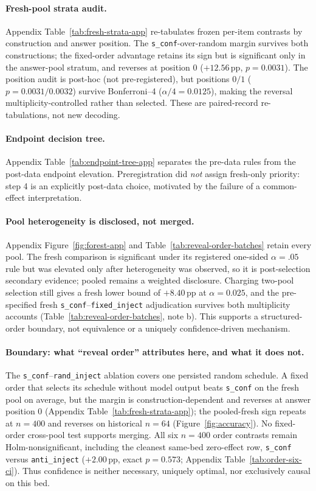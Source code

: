 \documentclass{article}
\newcommand{\sconf}{\texttt{s\_conf}}
\newcommand{\rinj}{\texttt{rand\_inject}}
\newcommand{\ainj}{\texttt{anti\_inject}}
\newcommand{\finj}{\texttt{fixed\_inject}}
\newcommand{\pp}{\,\mathrm{pp}}
\begin{document}
\paragraph{Fresh-pool strata audit.}
Appendix Table~\ref{tab:fresh-strata-app} re-tabulates frozen per-item contrasts by
construction and answer position.  The \sconf{}-over-random margin survives
both constructions; the fixed-order advantage retains its sign but is
significant only in the answer-pool stratum, and reverses at position $0$
($+12.56\pp$, $p{=}0.0031$).  The position audit is post-hoc (not
pre-registered), but positions $0/1$ ($p{=}0.0031/0.0032$) survive
Bonferroni--4 ($\alpha/4{=}0.0125$), making the reversal
multiplicity-controlled rather than selected.  These are paired-record
re-tabulations, not new decoding.

\paragraph{Endpoint decision tree.}
Appendix Table~\ref{tab:endpoint-tree-app} separates the pre-data rules from the post-data
endpoint elevation.  Preregistration did \emph{not} assign fresh-only priority:
step 4 is an explicitly post-data choice, motivated by the failure of a
common-effect interpretation.

\paragraph{Pool heterogeneity is disclosed, not merged.}
Appendix Figure~\ref{fig:forest-app} and Table~\ref{tab:reveal-order-batches} retain every
pool.  The fresh comparison is significant under its registered one-sided
$\alpha=.05$ rule but was elevated only after heterogeneity was observed, so it
is post-selection secondary evidence; pooled remains a weighted disclosure.
Charging two-pool selection still gives a fresh lower bound of $+8.40\pp$ at
$\alpha=0.025$, and the pre-specified fresh \sconf{}--\finj{} adjudication
survives both multiplicity accounts (Table~\ref{tab:reveal-order-batches}, note
b).  This supports a structured-order boundary, not equivalence or a uniquely
confidence-driven mechanism.

\paragraph{Boundary: what ``reveal order'' attributes here, and what it does not.}
The \sconf{}--\rinj{} ablation covers one persisted random schedule.  A
fixed order that selects its schedule without model output beats \sconf{} on
the fresh pool on average, but the margin is construction-dependent and
reverses at answer position 0 (Appendix Table~\ref{tab:fresh-strata-app}); the
pooled-fresh sign repeats at $n{=}400$ and reverses on historical $n{=}64$
(Figure~\ref{fig:accuracy}).  No fixed-order cross-pool test supports merging.
All six $n{=}400$ order contrasts remain Holm-nonsignificant, including the
cleanest same-bed zero-effect row, \sconf{} versus \ainj{} ($+2.00\pp$, exact
$p{=}0.573$; Appendix Table~\ref{tab:order-six-ci}).  Thus confidence is neither
necessary, uniquely optimal, nor exclusively causal on this bed.
\end{document}
